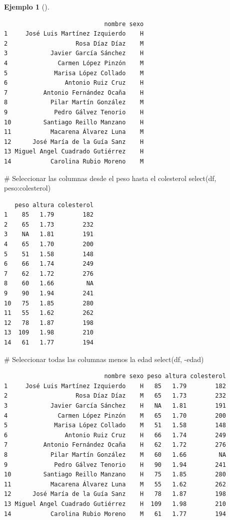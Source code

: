 \documentclass[
  a4paper,
]{scrreport}
\newenvironment{Shaded}{\begin{snugshade}}{\end{snugshade}}
\newcommand{\CommentTok}[1]{\textcolor[rgb]{0.37,0.37,0.37}{#1}}
\newcommand{\FunctionTok}[1]{\textcolor[rgb]{0.28,0.35,0.67}{#1}}
\newcommand{\NormalTok}[1]{\textcolor[rgb]{0.00,0.23,0.31}{#1}}
\newcommand{\SpecialCharTok}[1]{\textcolor[rgb]{0.37,0.37,0.37}{#1}}
\theoremstyle{definition}
\theoremstyle{definition}
\newtheorem{example}{Ejemplo}[chapter]
\theoremstyle{remark}
\begin{document}
\begin{example}[]
\begin{verbatim}
                            nombre sexo
1     José Luis Martínez Izquierdo    H
2                   Rosa Díaz Díaz    M
3            Javier García Sánchez    H
4              Carmen López Pinzón    M
5             Marisa López Collado    M
6                Antonio Ruiz Cruz    H
7          Antonio Fernández Ocaña    H
8            Pilar Martín González    M
9             Pedro Gálvez Tenorio    H
10         Santiago Reillo Manzano    H
11           Macarena Álvarez Luna    M
12      José María de la Guía Sanz    H
13 Miguel Angel Cuadrado Gutiérrez    H
14           Carolina Rubio Moreno    M
\end{verbatim}

\begin{Shaded}
\begin{Highlighting}[]
\CommentTok{\# Seleccionar las columnas desde el peso hasta el colesterol}
\FunctionTok{select}\NormalTok{(df, peso}\SpecialCharTok{:}\NormalTok{colesterol)}
\end{Highlighting}
\end{Shaded}

\begin{verbatim}
   peso altura colesterol
1    85   1.79        182
2    65   1.73        232
3    NA   1.81        191
4    65   1.70        200
5    51   1.58        148
6    66   1.74        249
7    62   1.72        276
8    60   1.66         NA
9    90   1.94        241
10   75   1.85        280
11   55   1.62        262
12   78   1.87        198
13  109   1.98        210
14   61   1.77        194
\end{verbatim}

\begin{Shaded}
\begin{Highlighting}[]
\CommentTok{\# Seleccionar todas las columnas menos la edad}
\FunctionTok{select}\NormalTok{(df, }\SpecialCharTok{{-}}\NormalTok{edad)}
\end{Highlighting}
\end{Shaded}

\begin{verbatim}
                            nombre sexo peso altura colesterol
1     José Luis Martínez Izquierdo    H   85   1.79        182
2                   Rosa Díaz Díaz    M   65   1.73        232
3            Javier García Sánchez    H   NA   1.81        191
4              Carmen López Pinzón    M   65   1.70        200
5             Marisa López Collado    M   51   1.58        148
6                Antonio Ruiz Cruz    H   66   1.74        249
7          Antonio Fernández Ocaña    H   62   1.72        276
8            Pilar Martín González    M   60   1.66         NA
9             Pedro Gálvez Tenorio    H   90   1.94        241
10         Santiago Reillo Manzano    H   75   1.85        280
11           Macarena Álvarez Luna    M   55   1.62        262
12      José María de la Guía Sanz    H   78   1.87        198
13 Miguel Angel Cuadrado Gutiérrez    H  109   1.98        210
14           Carolina Rubio Moreno    M   61   1.77        194
\end{verbatim}

\end{example}
\end{document}

